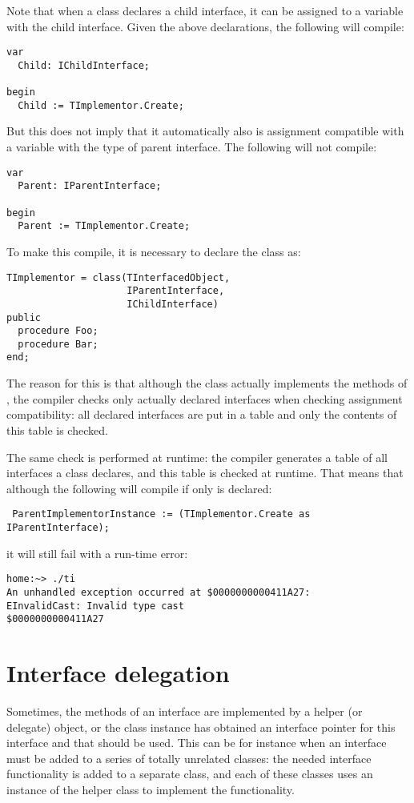 Note that when a class declares a child interface, it can be assigned to a variable with the child interface.
Given the above declarations, the following will compile:
\begin{verbatim}
var
  Child: IChildInterface;

begin
  Child := TImplementor.Create;
\end{verbatim}
But this does not imply that it automatically also is assignment compatible with a variable with the type of parent interface. The following will not compile:
\begin{verbatim}
var
  Parent: IParentInterface;

begin
  Parent := TImplementor.Create;
\end{verbatim}
To make this compile, it is necessary to declare the class as:
\begin{verbatim}
TImplementor = class(TInterfacedObject,
                     IParentInterface,
                     IChildInterface)
public
  procedure Foo;
  procedure Bar;
end;
\end{verbatim}
The reason for this is that although the class actually implements the methods of , the compiler checks only actually declared interfaces when checking assignment compatibility: all declared interfaces are put in a table and only the contents of this table is checked.

The same check is performed at runtime: the compiler generates a table of all interfaces a class declares, and this table is checked at runtime. That means that although the following will compile if only  is declared:
\begin{verbatim}
 ParentImplementorInstance := (TImplementor.Create as IParentInterface);
\end{verbatim}
it will still fail with a run-time error:
\begin{verbatim}
home:~> ./ti
An unhandled exception occurred at $0000000000411A27:
EInvalidCast: Invalid type cast
$0000000000411A27
\end{verbatim}

\section{Interface delegation}
Sometimes, the methods of an interface are implemented by a helper (or
delegate) object, or the class instance has obtained an interface pointer for
this interface and that should be used. This can be for instance when an
interface must be added to a series of totally unrelated classes: the needed
interface functionality is added to a separate class, and each of these
classes uses an instance of the helper class to implement the functionality.

